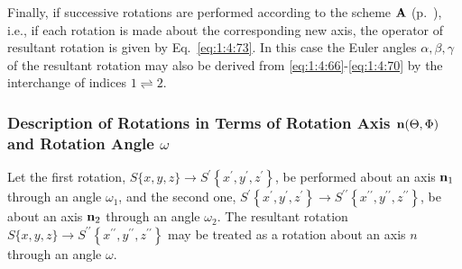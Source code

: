 Finally, if successive rotations are performed according to the scheme \(\mathbf{A}\) (p.~\pageref{schemeA}), i.e., if each rotation is made about the corresponding new axis, the operator of resultant rotation is given by Eq.~\eqref{eq:1:4:73}. In this case the Euler angles \(\alpha, \beta, \gamma\) of the resultant rotation may also be derived from \eqref{eq:1:4:66}-\eqref{eq:1:4:70} by the interchange of indices \(1 \rightleftharpoons 2\).

\subsubsection{Description of Rotations in Terms of Rotation Axis \(\mathbf{n}(\Theta, \Phi)\) and Rotation Angle \(\omega\)}
Let the first rotation, \(S\{x, y, z\} \rightarrow S^{\prime}\left\{x^{\prime}, y^{\prime}, z^{\prime}\right\}\), be performed about an axis \(\mathbf{n}_{1}\) through an angle \(\omega_{1}\), and the second one, \(S^{\prime}\left\{x^{\prime}, y^{\prime}, z^{\prime}\right\} \rightarrow S^{\prime \prime}\left\{x^{\prime \prime}, y^{\prime \prime}, z^{\prime \prime}\right\}\), be about an axis \(\mathbf{n}_{2}\) through an angle \(\omega_{2}\). The resultant rotation \(S\{x, y, z\} \rightarrow S^{\prime \prime}\left\{x^{\prime \prime}, y^{\prime \prime}, z^{\prime \prime}\right\}\) may be treated as a rotation about an axis \(n\) through an angle \(\omega\).

